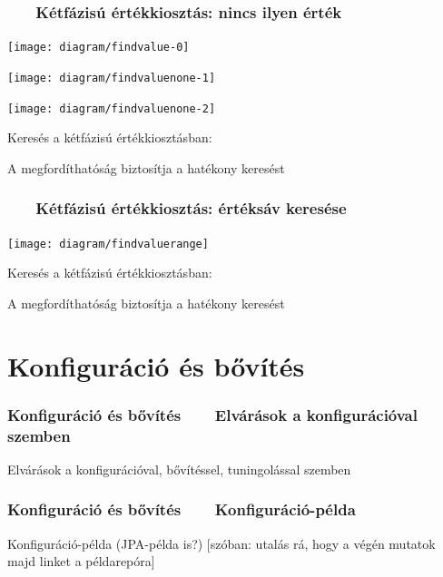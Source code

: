 \documentclass[
]{beamer}
\newcommand{\slidetitle}[2]{\frametitle{{\small #1 ~ \ding{226} ~ } \normalsize \textbf{#2} }}
\begin{document}
\begin{frame}
    \slidetitle{\sectionshorttitle}{Kétfázisú értékkiosztás: nincs ilyen érték}
    
    \centering
    
    \begin{overprint}
        \centerline{\texttt{[image: diagram/findvalue-0]}}
        \centerline{\texttt{[image: diagram/findvaluenone-1]}}
        \centerline{\texttt{[image: diagram/findvaluenone-2]}}
    \end{overprint}
    
    \vspace{0.5cm}
    
    Keresés a kétfázisú értékkiosztásban: \par
    A megfordíthatóság biztosítja a hatékony keresést
\end{frame}

\begin{frame}
    \slidetitle{\sectionshorttitle}{Kétfázisú értékkiosztás: értéksáv keresése}
    
    \centering
    
    \texttt{[image: diagram/findvaluerange]}
    
    \vspace{0.5cm}
    
    Keresés a kétfázisú értékkiosztásban: \par
    A megfordíthatóság biztosítja a hatékony keresést
\end{frame}

\section{Konfiguráció és bővítés}
\def\sectionshorttitle{Konfiguráció és bővítés}

\begin{frame}
    \slidetitle{\sectionshorttitle}{Elvárások a konfigurációval szemben}
    
    Elvárások a konfigurációval, bővítéssel, tuningolással szemben
\end{frame}

\begin{frame}
    \slidetitle{\sectionshorttitle}{Konfiguráció-példa}
    
    Konfiguráció-példa (JPA-példa is?)
    [szóban: utalás rá, hogy a végén mutatok majd linket a példarepóra]
\end{frame}
\end{document}
